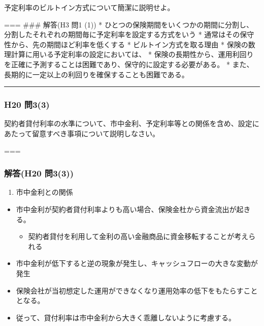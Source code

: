 \documentclass[]{article}
\begin{document}
予定利率のビルトイン方式について簡潔に説明せよ。

=== \#\#\# 解答(H3 問1 (1)) *
ひとつの保険期間をいくつかの期間に分割し、分割したそれぞれの期間毎に予定利率を設定する方式をいう
* 通常はその保守性から、先の期間ほど利率を低くする *
ビルトイン方式を取る理由 *
保険の数理計算に用いる予定利率の設定においては、 *
保険の長期性から、運用利回りを正確に予測することは困難であり、保守的に設定する必要がある。
* また、長期的に一定以上の利回りを確保することも困難である。

\begin{center}\rule{0.5\linewidth}{0.5pt}\end{center}

\hypertarget{h20-ux554f33}{%
\subsubsection{H20 問3(3)}\label{h20-ux554f33}}

契約者貸付利率の水準について、市中金利、予定利率等との関係を含め、設定にあたって留意すべき事項について説明しなさい。

===

\hypertarget{ux89e3ux7b54h20-ux554f33}{%
\subsubsection{解答(H20 問3(3))}\label{ux89e3ux7b54h20-ux554f33}}

\begin{enumerate}
\def\labelenumi{\arabic{enumi}.}
\tightlist
\item
  市中金利との関係
\end{enumerate}

\begin{itemize}
\tightlist
\item
  市中金利が契約者貸付利率よりも高い場合、保険金杜から資金流出が起きる。

  \begin{itemize}
  \tightlist
  \item
    契約者貸付を利用して金利の高い金融商品に資金移転することが考えられる
  \end{itemize}
\item
  市中金利が低下すると逆の現象が発生し、キャッシュフローの大きな変動が発生
\item
  保険会社が当初想定した運用ができなくなり運用効率の低下をもたらすこととなる。
\item
  従って、貸付利率は市中金利から大きく乖離しないように考慮する。
\end{itemize}
\end{document}
